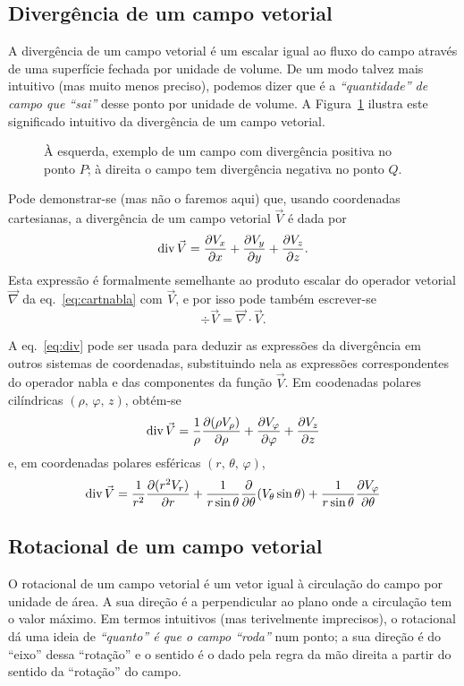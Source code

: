 \subsection*{Divergência de um campo vetorial}
A divergência de um campo vetorial é um escalar igual ao fluxo do campo através
de uma superfície fechada por unidade de volume.  De um modo talvez mais
intuitivo (mas muito menos preciso), podemos dizer que é a \emph{``quantidade''
de campo que ``sai''} desse ponto por unidade de volume. A
Figura~\ref{fig:10-020} ilustra este significado intuitivo da divergência de um
campo vetorial.
\begin{figure}[htb]
  {\centering
    \par
  }
  \caption{À esquerda, exemplo de um campo com divergência positiva no ponto
  $P$; à direita o campo tem divergência negativa no ponto
  $Q$.\label{fig:10-020}}
\end{figure}


Pode demonstrar-se (mas não o faremos aqui) que, usando coordenadas cartesianas,
a divergência de um campo vetorial $\vec V$ é dada por
\begin{equation}\label{eq:divcart}
  \div\vec V=\pd{V_x}{x} + \pd{V_y}{y}+\pd{V_z}{z}.
\end{equation}
Esta expressão é formalmente semelhante ao produto escalar do operador vetorial
$\vec\nabla$ da eq.~\eqref{eq:cartnabla} com $\vec V$, e por isso pode também
escrever-se
\begin{equation}\label{eq:div}
  \div\vec V=\vec\nabla\cdot\vec V.
\end{equation}

A eq.~\eqref{eq:div} pode ser usada para deduzir as expressões da divergência em
outros sistemas de coordenadas, substituindo nela as expressões correspondentes
do operador nabla e das componentes da função $\vec V$. Em coodenadas polares
cilíndricas $(\rho,\,\varphi,\,z)$, obtém-se
\begin{equation}
\div\vec V=\frac{1}{\rho}\pd{(\rho V_\rho)}{\rho}
    +\pd{V_\varphi}{\varphi}+\pd{V_z}{z}
\end{equation}
e, em coordenadas polares esféricas $(r,\,\theta,\,\varphi)$, 
\begin{equation}
\div \vec V=\frac{1}{r^2}\pd{(r^2V_r)}{r}+
    \frac{1}{r\sin\theta}\pd{}{\theta}(V_\theta\sin\theta)+
    \frac{1}{r\sin\theta}\pd{V_\varphi}{\theta}
\end{equation}

\subsection*{Rotacional de um campo vetorial}
O rotacional de um campo vetorial é um vetor igual à circulação do campo por
unidade de área. A sua direção é a perpendicular ao plano onde a circulação tem
o valor máximo. Em termos intuitivos (mas terivelmente imprecisos), o rotacional
dá uma ideia de \emph{``quanto'' é que o campo ``roda''} num ponto; a sua
direção é do ``eixo'' dessa ``rotação'' e o sentido é o dado pela regra da mão
direita a partir do sentido da ``rotação'' do campo. 

